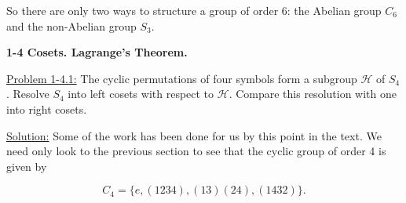 \documentclass[12pt]{article}
\begin{document}
So there are only two ways to structure a group of order 6: the Abelian group
$C_6$ and the non-Abelian group $S_3$.

\textbf{1-4 Cosets. Lagrange's Theorem.}

\underline{Problem 1-4.1:} The cyclic permutations of four symbols form a
subgroup $\mathcal{H}$ of $S_4$. Resolve $S_4$ into left cosets with respect to
$\mathcal{H}$. Compare this resolution with one into right cosets.

\underline{Solution:} Some of the work has been done for us by this point in
the text. We need only look to the previous section to see that the cyclic
group of order 4 is given by

\[ 
C_4 = \{ e, (1234), (13)(24), (1432)\}.
\]
\end{document}
